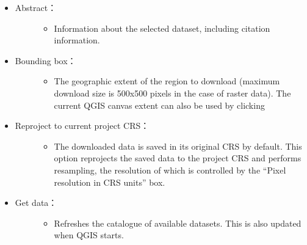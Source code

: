 \documentclass[letterpaper,10pt,english]{sphinxmanual}
\begin{document}
\begin{itemize}
\begin{description}
\end{description}

\item {} \begin{description}
\item[{Abstract：}] \leavevmode\begin{itemize}
\item {} 
Information about the selected dataset, including citation information.

\end{itemize}

\end{description}

\item {} \begin{description}
\item[{Bounding box：}] \leavevmode\begin{itemize}
\item {} 
The geographic extent of the region to download (maximum download size is 500x500 pixels in the case of raster data). The current QGIS canvas extent can also be used by clicking 

\end{itemize}

\end{description}

\item {} \begin{description}
\item[{Reproject to current project CRS：}] \leavevmode\begin{itemize}
\item {} 
The downloaded data is saved in its original CRS by default. This option reprojects the saved data to the project CRS and performs resampling, the resolution of which is controlled by the “Pixel resolution in CRS units” box.

\end{itemize}

\end{description}

\item {} \begin{description}
\item[{Get data：}] \leavevmode\begin{itemize}
\item {} 
Refreshes the catalogue of available datasets. This is also updated when QGIS starts.


\end{itemize}
\end{description}
\end{itemize}
\end{document}
